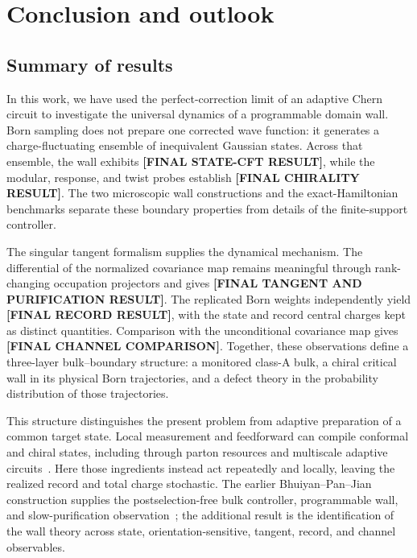 \documentclass[aps,prx,twocolumn,superscriptaddress,longbibliography,nofootinbib,floatfix]{revtex4-2}
\newcommand{\ResultPlaceholder}[1]{\ignorespaces}
\newcommand{\ResultValue}[1]{\textcolor{BrickRed}{\textbf{[#1]}}}
\begin{document}
\section{Conclusion and outlook}
\label{sec:conclusion}

\subsection{Summary of results}
\label{sec:discussion}

In this work, we have used the perfect-correction limit of an adaptive Chern circuit to investigate the universal dynamics of a programmable domain wall.  Born sampling does not prepare one corrected wave function: it generates a charge-fluctuating ensemble of inequivalent Gaussian states.  Across that ensemble, the wall exhibits \ResultValue{FINAL STATE-CFT RESULT}, while the modular, response, and twist probes establish \ResultValue{FINAL CHIRALITY RESULT}.  The two microscopic wall constructions and the exact-Hamiltonian benchmarks separate these boundary properties from details of the finite-support controller.

The singular tangent formalism supplies the dynamical mechanism.  The differential of the normalized covariance map remains meaningful through rank-changing occupation projectors and gives \ResultValue{FINAL TANGENT AND PURIFICATION RESULT}.  The replicated Born weights independently yield \ResultValue{FINAL RECORD RESULT}, with the state and record central charges kept as distinct quantities.  Comparison with the unconditional covariance map gives \ResultValue{FINAL CHANNEL COMPARISON}.  Together, these observations define a three-layer bulk--boundary structure: a monitored class-A bulk, a chiral critical wall in its physical Born trajectories, and a defect theory in the probability distribution of those trajectories.  \ResultPlaceholder{Final synthesis paragraph to be rewritten around the subset of state, chirality, tangent, record, and channel claims that survive the complete acceptance table.}

This structure distinguishes the present problem from adaptive preparation of a common target state.  Local measurement and feedforward can compile conformal and chiral states, including through parton resources and multiscale adaptive circuits~\cite{LuLessaKimHsieh2022}.  Here those ingredients instead act repeatedly and locally, leaving the realized record and total charge stochastic.  The earlier Bhuiyan--Pan--Jian construction supplies the postselection-free bulk controller, programmable wall, and slow-purification observation~\cite{BhuiyanPanJian2026}; the additional result is the identification of the wall theory across state, orientation-sensitive, tangent, record, and channel observables.
\end{document}
